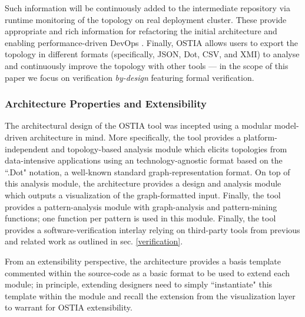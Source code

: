 \documentclass[smallextended]{svjour3}       %
\begin{document}
Such information will be continuously added to the intermediate repository via
runtime monitoring of the topology on real deployment cluster. These provide
appropriate and rich information for refactoring the initial architecture and
enabling performance-driven DevOps \cite{brunnert2015performance}.
Finally, OSTIA allows users to export the topology in different formats
(specifically, JSON, Dot, CSV, and XMI) to analyse and continuously improve the topology with other tools --- in the scope of this paper we focus on verification \emph{by-design} featuring formal verification.

{\color{blue}
\subsubsection{Architecture Properties and Extensibility}

The architectural design of the OSTIA tool was incepted using a modular model-driven architecture \cite{mda} in mind. More specifically, the tool provides a platform-independent and topology-based analysis module which elicits topologies from data-intensive applications using an technology-agnostic format based on the ``.Dot" notation, a well-known standard graph-representation format. On top of this analysis module, the architecture provides a design and analysis module which outputs a visualization of the graph-formatted input. Finally, the tool provides a pattern-analysis module with graph-analysis and pattern-mining functions; one function per pattern is used in this module. Finally, the tool provides a software-verification interlay relying on third-party tools from previous and related work as outlined in sec. \ref{verification}.

From an extensibility perspective, the architecture provides a basis template commented within the source-code as a basic format to be used to extend each module; in principle, extending designers need to simply ``instantiate" this template within the module and recall the extension from the visualization layer to warrant for OSTIA extensibility.

}
\end{document}
